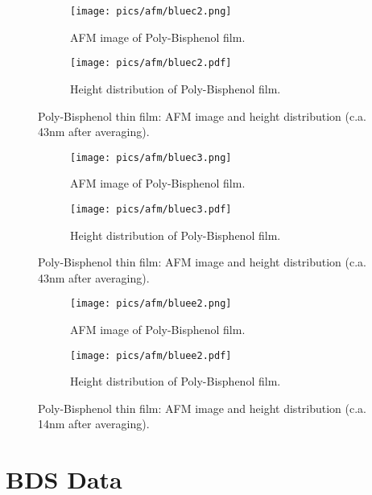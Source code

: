 \begin{figure}[!htb]
\centering
\begin{subfigure}[t]{.5\textwidth}
  \centering
  \texttt{[image: pics/afm/bluec2.png]}
  \caption{AFM image of Poly-Bisphenol film.}
  \label{PolyBisphenol_AFM}
\end{subfigure}%
\begin{subfigure}[t]{.5\textwidth}
  \centering
  \texttt{[image: pics/afm/bluec2.pdf]}
  \caption{Height distribution of Poly-Bisphenol film.}
  \label{PolyBisphenol_HeightDist}
\end{subfigure}
\caption{Poly-Bisphenol thin film: AFM image and height distribution (c.a. 43nm after averaging).}
\end{figure}

\begin{figure}[!htb]
\centering
\begin{subfigure}[t]{.5\textwidth}
  \centering
  \texttt{[image: pics/afm/bluec3.png]}
  \caption{AFM image of Poly-Bisphenol film.}
  \label{PolyBisphenol_AFM}
\end{subfigure}%
\begin{subfigure}[t]{.5\textwidth}
  \centering
  \texttt{[image: pics/afm/bluec3.pdf]}
  \caption{Height distribution of Poly-Bisphenol film.}
  \label{PolyBisphenol_HeightDist}
\end{subfigure}
\caption{Poly-Bisphenol thin film: AFM image and height distribution (c.a. 43nm after averaging).}
\end{figure}


\begin{figure}[!htb]
\centering
\begin{subfigure}[t]{.5\textwidth}
  \centering
  \texttt{[image: pics/afm/bluee2.png]}
  \caption{AFM image of Poly-Bisphenol film.}
  \label{PolyBisphenol_AFM}
\end{subfigure}%
\begin{subfigure}[t]{.5\textwidth}
  \centering
  \texttt{[image: pics/afm/bluee2.pdf]}
  \caption{Height distribution of Poly-Bisphenol film.}
  \label{PolyBisphenol_HeightDist}
\end{subfigure}
\caption{Poly-Bisphenol thin film: AFM image and height distribution (c.a. 14nm after averaging).}
\end{figure}

\chapter{BDS Data}



